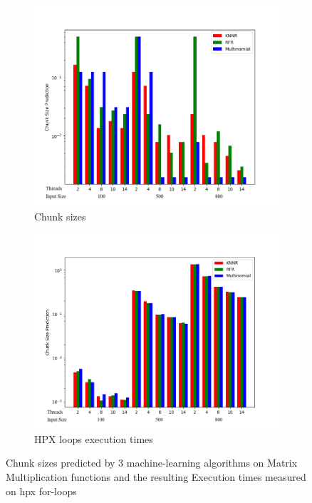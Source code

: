 \begin{figure}[h]
	\centering
	\begin{subfigure}[b]{0.5\textwidth}
		\centering
		\includegraphics[width=\textwidth]{images/matrix_mult_corrected_predictions_bar.png}
		\caption[Network2]%
		{{Chunk sizes}}    
	\end{subfigure}
	\hfill
	\begin{subfigure}[b]{0.49\textwidth}  
		\centering 
		\includegraphics[width=\textwidth]{images/matrix_mult_corrected_times_bar.png}
		\caption[]%
		{{HPX loops execution times}}    
	\end{subfigure}
		\caption{Chunk sizes predicted by 3 machine-learning algorithms on Matrix Multiplication functions and the resulting Execution times measured on hpx for-loops} 
	
\end{figure}

